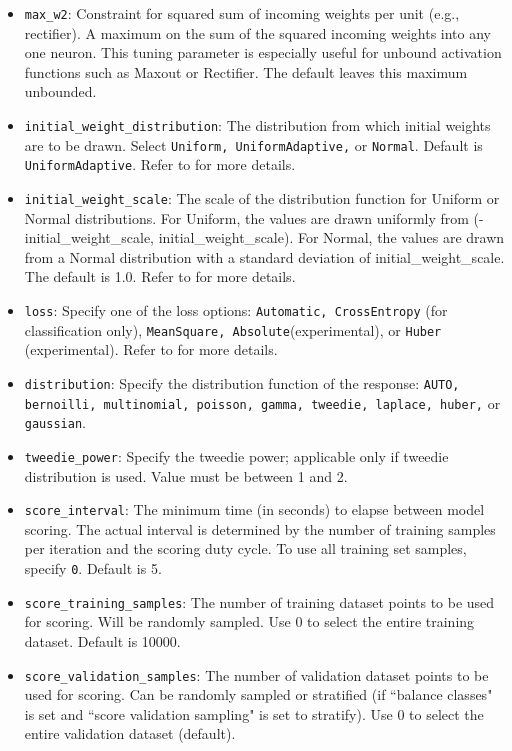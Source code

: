 \documentclass{article}[11pt]
\begin{document}
\begin{itemize}
\item \texttt{max\_w2}: Constraint for squared sum of incoming weights per unit (e.g., rectifier). A maximum on the sum of the squared incoming weights into any one neuron. This tuning parameter is especially useful for unbound activation functions such as Maxout or Rectifier. The default leaves this maximum unbounded.
\item \texttt{initial\_weight\_distribution}: The distribution from which initial weights are to be drawn. Select \texttt{Uniform, UniformAdaptive,} or \texttt{Normal}. Default is \texttt{UniformAdaptive}. Refer to  for more details.
\item \texttt{initial\_weight\_scale}: The scale of the distribution function for Uniform or Normal distributions. For Uniform, the values are drawn uniformly from (-initial\_weight\_scale, initial\_weight\_scale). For Normal, the values are drawn from a Normal distribution with a standard deviation of initial\_weight\_scale. The default is 1.0. Refer to  for more details.
\item \texttt{loss}: Specify one of the loss options: \texttt{Automatic, CrossEntropy} (for classification only), \texttt{MeanSquare, Absolute}(experimental), or \texttt{Huber} (experimental). Refer to  for more details.
\item \texttt{distribution}: Specify the distribution function of the response: \texttt{AUTO, bernoilli, multinomial, poisson, gamma, tweedie, laplace, huber,} or \texttt{gaussian}. 
\item \texttt{tweedie\_power}: Specify the tweedie power; applicable only if tweedie distribution is used. Value must be between 1 and 2. 
\item \texttt{score\_interval}: The minimum time (in seconds) to elapse between model scoring. The actual interval is determined by the number of training samples per iteration and the scoring duty cycle. To use all training set samples, specify \texttt{0}. Default is 5.
\item \texttt{score\_training\_samples}: The number of training dataset points to be used for scoring. Will be randomly sampled. Use 0 to select the entire training dataset. Default is 10000.
\item \texttt{score\_validation\_samples}: The number of validation dataset points to be used for scoring. Can be randomly sampled or stratified (if ``balance classes" is set and ``score validation sampling" is set to stratify). Use 0 to select the entire validation dataset (default).

\end{itemize}
\end{document}
